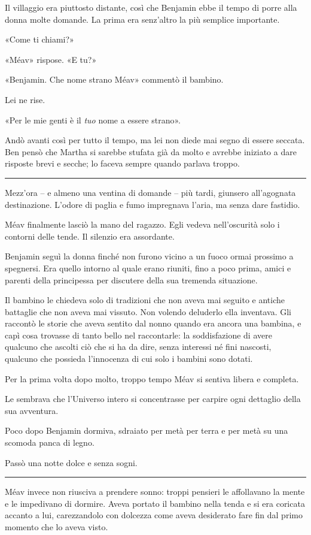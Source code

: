 \documentclass[a4paper,11pt,oneside,openright,final]{memoir}
\begin{document}
Il villaggio era piuttosto distante, così che Benjamin ebbe il tempo di porre
alla donna molte domande. La prima era senz'altro la più semplice importante.

«Come ti chiami?»

«Méav» rispose. «E tu?»

«Benjamin. Che nome strano Méav» commentò il bambino.

Lei ne rise.

«Per le mie genti è il \emph{tuo} nome a essere strano».

Andò avanti così per tutto il tempo, ma lei non diede mai segno di essere
seccata. Ben pensò che Martha si sarebbe stufata già da molto e avrebbe
iniziato a dare risposte brevi e secche; lo faceva sempre quando parlava troppo.

\plainbreak{1}

Mezz'ora -- e almeno una ventina di domande -- più tardi, giunsero
all'agognata destinazione. L'odore di paglia e fumo impregnava l'aria, ma senza
dare fastidio.

Méav finalmente lasciò la mano del ragazzo. Egli vedeva nell'oscurità solo i
contorni delle tende. Il silenzio era assordante.

Benjamin seguì la donna finché non furono vicino a un fuoco ormai prossimo a
spegnersi. Era quello intorno al quale erano riuniti, fino a poco prima, amici e
parenti della principessa per discutere della sua tremenda situazione.

Il bambino le chiedeva solo di tradizioni che non aveva mai seguito e antiche
battaglie che non aveva mai vissuto. Non volendo deluderlo ella inventava. Gli
raccontò le storie che aveva sentito dal nonno quando era ancora una bambina, e
capì cosa trovasse di tanto bello nel raccontarle: la soddisfazione di avere
qualcuno che ascolti ciò che si ha da dire, senza interessi né fini nascosti,
qualcuno che possieda l'innocenza di cui solo i bambini sono dotati.

Per la prima volta dopo molto, troppo tempo Méav si sentiva libera e completa.

Le sembrava che l'Universo intero si concentrasse per carpire ogni dettaglio
della sua avventura.

Poco dopo Benjamin dormiva, sdraiato per metà per terra e per metà su una
scomoda panca di legno.

Passò una notte dolce e senza sogni.

\plainbreak{1}

Méav invece non riusciva a prendere sonno: troppi pensieri le affollavano la
mente e le impedivano di dormire. Aveva portato il bambino nella tenda e si era
coricata accanto a lui, carezzandolo con dolcezza come aveva desiderato fare fin
dal primo momento che lo aveva visto.
\end{document}

